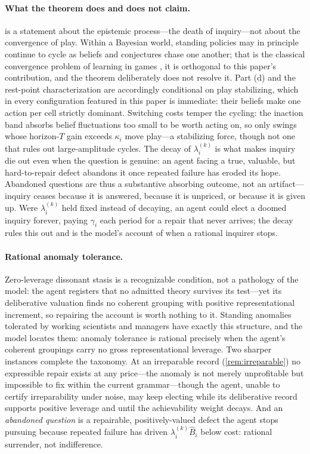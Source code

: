 \documentclass[11pt]{article}
\theoremstyle{definition}
\begin{document}
\paragraph{What the theorem does and does not claim.}
\label{rem:scope}
 is a statement about the epistemic process---the death of inquiry---not about the convergence of play.
Within a Bayesian world, standing policies may in principle continue to cycle as beliefs and conjectures chase one another; that is the classical convergence problem of learning in games \citep{FudenbergLevine1993,KalaiLehrer1993a}, it is orthogonal to this paper's contribution, and the theorem deliberately does not resolve it.
Part (d) and the rest-point characterization are accordingly conditional on play stabilizing, which in every configuration featured in this paper is immediate: their beliefs make one action per cell strictly dominant.
Switching costs temper the cycling: the inaction band absorbs belief fluctuations too small to be worth acting on, so only swings whose horizon-$T$ gain exceeds $\kappa_i$ move play---a stabilizing force, though not one that rules out large-amplitude cycles.
The decay of $\lambda_i^{(k)}$ is what makes inquiry die out even when the question is genuine: an agent facing a true, valuable, but hard-to-repair defect abandons it once repeated failure has eroded its hope.
Abandoned questions are thus a substantive absorbing outcome, not an artifact---inquiry ceases because it is answered, because it is unpriced, or because it is given up.
Were $\lambda_i^{(k)}$ held fixed instead of decaying, an agent could elect a doomed inquiry forever, paying $\gamma_i$ each period for a repair that never arrives; the decay rules this out and is the model's account of when a rational inquirer stops.

\paragraph{Rational anomaly tolerance.}
\label{rem:anomaly}
Zero-leverage dissonant stasis is a recognizable condition, not a pathology of the model: the agent registers that no admitted theory survives its test---yet its deliberative valuation finds no coherent grouping with positive representational increment, so repairing the account is worth nothing to it.
Standing anomalies tolerated by working scientists and managers have exactly this structure, and the model locates them: anomaly tolerance is rational precisely when the agent's coherent groupings carry no gross representational leverage.
Two sharper instances complete the taxonomy.
At an irreparable record (\cref{rem:irreparable}) no expressible repair exists at any price---the anomaly is not merely unprofitable but impossible to fix within the current grammar---though the agent, unable to certify irreparability under noise, may keep electing while its deliberative record supports positive leverage and until the achievability weight decays.
And an \emph{abandoned question} is a repairable, positively-valued defect the agent stops pursuing because repeated failure has driven $\lambda_i^{(k)}\widehat B_i$ below cost: rational surrender, not indifference.
\end{document}
